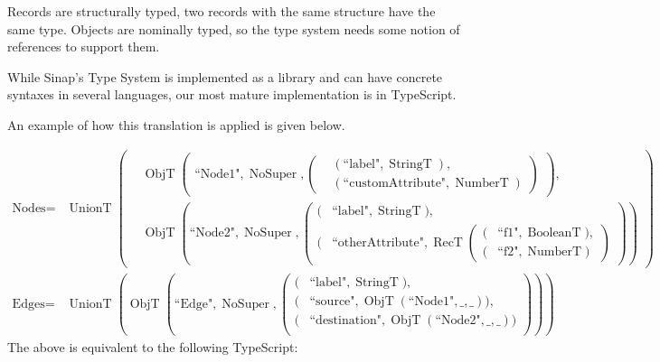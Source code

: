 \documentclass{article}
\DeclareMathOperator{\StringT}{StringT}
\DeclareMathOperator{\NumberT}{NumberT}
\DeclareMathOperator{\BooleanT}{BooleanT}
\DeclareMathOperator{\RecT}{RecT}
\DeclareMathOperator{\ObjT}{ObjT}
\DeclareMathOperator{\UnionT}{UnionT}
\DeclareMathOperator{\NoSuper}{NoSuper}
\begin{document}
Records are structurally typed, two records with the same structure have
the same type. Objects are nominally typed, so the type system needs some
notion of references to support them. 

While Sinap's Type System is implemented as a library and can have 
concrete syntaxes in several languages, our most mature implementation 
is in TypeScript. 

An example of how this translation is applied is given below.

\begin{align*}
    \text{Nodes} = &\UnionT\left(
        \begin{aligned}
        &\ObjT\left(
            \begin{aligned}    
                \text{``Node1"}, \NoSuper, \left(
                    \begin{aligned}
                        &(\text{``label"}, \StringT),  \\
                        &(\text{``customAttribute"}, \NumberT)
                    \end{aligned}\right)
            \end{aligned}\right),  \\
        &\ObjT\left(\text{``Node2"}, \NoSuper, \left(\begin{aligned}
            (&\text{``label"}, \StringT),  \\
            (&\text{``otherAttribute"}, \RecT\left(
                \begin{aligned}
                    (&\text{``f1"}, \BooleanT),  \\
                    (&\text{``f2"}, \NumberT)
                \end{aligned}\right)
        \end{aligned}\right)\right)
        \end{aligned}\right)  \\
    \text{Edges} = &\UnionT\left(\ObjT\left(
        \text{``Edge"}, \NoSuper,  
        \left(\begin{aligned}
            (&\text{``label"}, \StringT), \\
            (&\text{``source"}, \ObjT(\text{``Node1"}, \_, \_)), \\
            (&\text{``destination"}, \ObjT(\text{``Node2"}, \_, \_)) \\             
        \end{aligned}\right)\right)\right)
\end{align*}
The above is equivalent to the following TypeScript:
\end{document}
